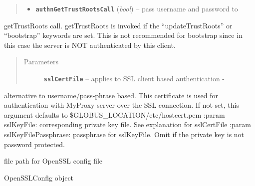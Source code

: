 \documentclass[letterpaper,10pt,english]{sphinxmanual}
\begin{document}
\begin{fulllineitems}
\begin{fulllineitems}
\begin{quote}
\begin{description}
\begin{itemize}
\item {} 
\textbf{\texttt{authnGetTrustRootsCall}} (\emph{bool}) -- pass username and password to

\end{itemize}

\end{description}\end{quote}

getTrustRoots call.  getTrustRoots is invoked if the ``updateTrustRoots''
or ``bootstrap'' keywords are set.  This is not recommended for 
bootstrap since in this case the server is NOT authenticated by this 
client.
\begin{quote}\begin{description}
\item[{Parameters}] \leavevmode
\textbf{\texttt{sslCertFile}} -- applies to SSL client based authentication -

\end{description}\end{quote}

alternative to username/pass-phrase based.  This certificate is used for 
authentication with MyProxy server over the SSL connection.  If not set,
this argument defaults to \$GLOBUS\_LOCATION/etc/hostcert.pem 
:param sslKeyFile: corresponding private key file.  See explanation
for sslCertFile
:param sslKeyFilePassphrase: passphrase for sslKeyFile.  Omit if the
private key is not password protected.

\end{fulllineitems}


\begin{fulllineitems}
\label{client:myproxy.client.MyProxyClient.openSSLConfFilePath}
file path for OpenSSL config file

\end{fulllineitems}


\begin{fulllineitems}
\label{client:myproxy.client.MyProxyClient.openSSLConfig}
OpenSSLConfig object

\end{fulllineitems}



\end{fulllineitems}
\end{document}
